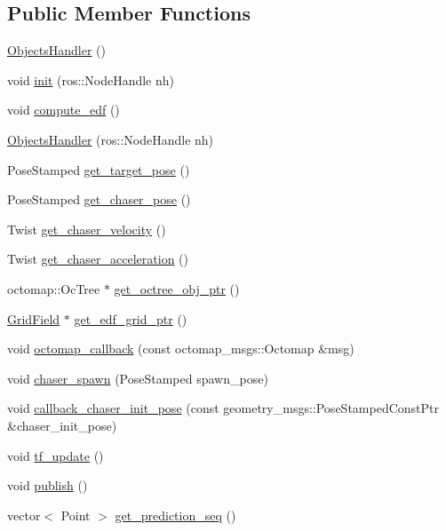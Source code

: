 \subsection*{Public Member Functions}
\begin{DoxyCompactItemize}
\item 
\hyperlink{class_objects_handler_a932c6bc722daa78f4f8e31894911c4c7}{Objects\+Handler} ()
\item 
void \hyperlink{class_objects_handler_a1ac7fcad5fa6033c2435ac49f2f9dff5}{init} (ros\+::\+Node\+Handle nh)
\item 
void \hyperlink{class_objects_handler_ae6da4f0f0a265c75722e02d68d519f07}{compute\+\_\+edf} ()
\item 
\hyperlink{class_objects_handler_a5d3298d7029619c1931d3dda34278e05}{Objects\+Handler} (ros\+::\+Node\+Handle nh)
\item 
Pose\+Stamped \hyperlink{class_objects_handler_a2b9e69afe54afea0380431d8f1f5142d}{get\+\_\+target\+\_\+pose} ()
\item 
Pose\+Stamped \hyperlink{class_objects_handler_a4ac7a7bb712575c2ff6ffbf37144cf56}{get\+\_\+chaser\+\_\+pose} ()
\item 
Twist \hyperlink{class_objects_handler_aa1af309b0e964ccb6df8dede045fa32b}{get\+\_\+chaser\+\_\+velocity} ()
\item 
Twist \hyperlink{class_objects_handler_a41d48832b07a4d4276147a99dd1d31bc}{get\+\_\+chaser\+\_\+acceleration} ()
\item 
octomap\+::\+Oc\+Tree $\ast$ \hyperlink{class_objects_handler_a988bdf05045c40348b34ae8beecd8884}{get\+\_\+octree\+\_\+obj\+\_\+ptr} ()
\item 
\hyperlink{struct_grid_field}{Grid\+Field} $\ast$ \hyperlink{class_objects_handler_afe849882d1feeef8316a45632381da54}{get\+\_\+edf\+\_\+grid\+\_\+ptr} ()
\item 
void \hyperlink{class_objects_handler_a5744110d979850b3e2d8896793435d0c}{octomap\+\_\+callback} (const octomap\+\_\+msgs\+::\+Octomap \&msg)
\item 
void \hyperlink{class_objects_handler_a968feba95e0707919b6c3632781510ba}{chaser\+\_\+spawn} (Pose\+Stamped spawn\+\_\+pose)
\item 
void \hyperlink{class_objects_handler_a4c56416d3583b70d181d69d900b884b5}{callback\+\_\+chaser\+\_\+init\+\_\+pose} (const geometry\+\_\+msgs\+::\+Pose\+Stamped\+Const\+Ptr \&chaser\+\_\+init\+\_\+pose)
\item 
void \hyperlink{class_objects_handler_a6896e4f9863bd1a4fbc8498d0cb20f09}{tf\+\_\+update} ()
\item 
void \hyperlink{class_objects_handler_a16cf7fca3059a03da4ec795f2af7fb74}{publish} ()
\item 
vector$<$ Point $>$ \hyperlink{class_objects_handler_a4793f1ed257c849b28f0386f635ee714}{get\+\_\+prediction\+\_\+seq} ()
\end{DoxyCompactItemize}
